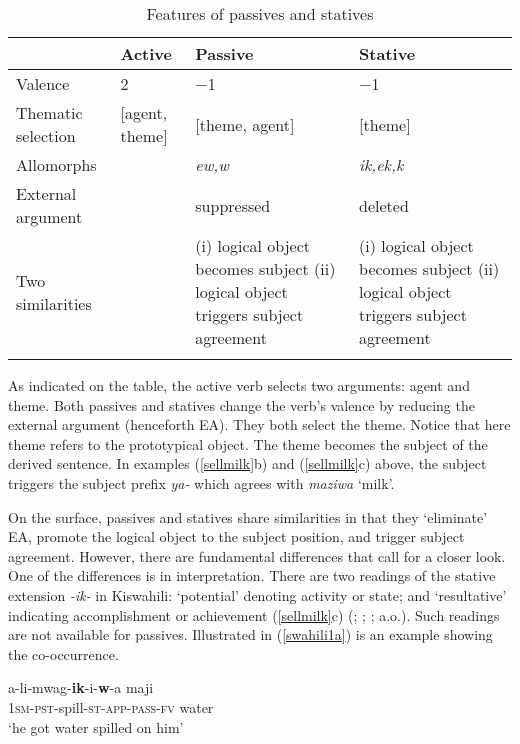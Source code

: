 \documentclass[output=paper]{langscibook}
\begin{document}
\begin{table}
\begin{tabularx}{\textwidth}{l QQQ}
 \lsptoprule
  & Active & Passive & Stative\\
\midrule
 Valence & 2 & −1 & −1\\
  Thematic selection & [agent, theme]  & [theme, agent] & [theme]\\
 Allomorphs   &   &\textit{ew,w} & \textit{ik,ek,k}\\
 External argument &  & suppressed & deleted\\
 Two similarities   &  & (i) logical object becomes subject   (ii) logical object triggers subject agreement & (i) logical object becomes subject   (ii) logical object triggers subject agreement\\
  \lspbottomrule
 \end{tabularx}
    \caption{Features of passives and statives\label{con_ngo:table1}}
\end{table}

As indicated on the table, the active verb selects two arguments: agent and theme. Both passives and statives change the verb's valence by reducing the external argument (henceforth EA). They both select the theme. Notice that here theme refers to the prototypical object. The theme becomes the subject of the derived sentence. In examples (\ref{sellmilk}b) and (\ref{sellmilk}c) above, the subject triggers the subject prefix \textit{ya-} which agrees with \textit{maziwa} `milk’.  

On the surface, passives and statives share similarities in that they `eliminate’ EA, promote the logical object to the subject position, and trigger subject agreement. However, there are fundamental differences that call for a closer look. One of the differences is in interpretation. There are two readings of the stative extension \textit{-ik-} in Kiswahili: `potential’ denoting activity or state; and `resultative’ indicating accomplishment or achievement (\ref{sellmilk}c) (\citet{Simango:2009aa}; \citet{Levin:1993aa}; \citet{vendler67}; a.o.). Such readings are not available for passives. Illustrated in (\ref{swahili1a}) is an example showing the co-occurrence.

\begin{exe}
\ex\label{swahili1a}{
\gll a-li-mwag-\textbf{ik}-i-\textbf{w}-a   maji\\
\textsc{1sm-pst}-spill-\textsc{st-app-pass-fv}  water\\
\glt `he got water spilled on him'}
\end{exe}
\end{document}
